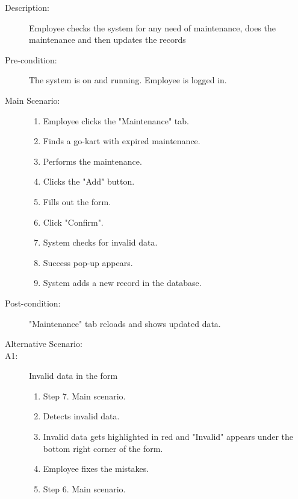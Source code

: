 \documentclass{article}
\begin{document}
\begin{description}
    \item[Description:] Employee checks the system for any need of maintenance, does the maintenance and then updates the records
    \item[Pre-condition:] The system is on and running. Employee is logged in.
    \item[Main Scenario:] \hfill
    \begin{enumerate}
        \item Employee clicks the "Maintenance" tab.
        \item Finds a go-kart with expired maintenance.
        \item Performs the maintenance.
        \item Clicks the "Add" button.
        \item Fills out the form.
        \item Click "Confirm".
        \item System checks for invalid data.
        \item Success pop-up appears.
        \item System adds a new record in the database.
    \end{enumerate}
    \item[Post-condition:] "Maintenance" tab reloads and shows updated data.
    \item[Alternative Scenario:] \hfill
    \item[A1:] Invalid data in the form
    \begin{enumerate}
        \item Step 7. Main scenario.
        \item Detects invalid data.
        \item Invalid data gets highlighted in red and "Invalid" appears under the bottom right corner of the form.
        \item Employee fixes the mistakes.
        \item Step 6. Main scenario.
    \end{enumerate}
\end{description}
\end{document}
